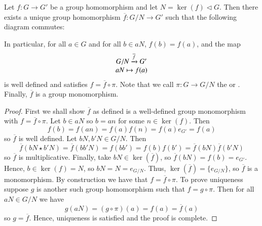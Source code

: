 \documentclass[12pt, a4paper, oneside, openright, titlepage]{book}
\begin{document}
\begin{namthm}
        Let $f:G\rightarrow G'$ be a group homomorphism and let $N = \ker(f) \vartriangleleft G$. Then there exists a unique group homomorphism $\overline{f}:G/N\rightarrow G'$ such that the following diagram commutes: 
        \begin{center}
        \end{center}
        In particular, for all $a \in G$ and for all $b \in aN$, $f(b) = f(a)$, and the map \begin{equation}
                \begin{array}{c} G/N\xrightarrow{\overline{f}} G' \\ aN\mapsto f(a) \end{array}
        \end{equation}
        is well defined and satisfies $f = \overline{f} \circ \pi$. Note that we call $\pi:G\rightarrow G/N$ the  or . Finally, $\overline{f}$ is a group monomorphism.
\end{namthm}
\begin{proof}
        First we shall show $\overline{f}$ as defined is a well-defined group monomorphism with $f = \overline{f} \circ \pi$. Let $b \in aN$ so $b = an$ for some $n \in \ker(f)$. Then $$f(b) = f(an) = f(a)f(n) = f(a)e_{G'} = f(a)$$ so $\overline{f}$ is well defined. Let $bN,b'N \in G/N$. Then $$\overline{f}(bN\star b'N) = \overline{f}(bb'N) = f(bb') = f(b)f(b') = \overline{f}(bN)\overline{f}(b'N)$$ so $\overline{f}$ is multiplicative. Finally, take $bN \in \ker(\overline{f})$, so $\overline{f}(bN) = f(b) = e_{G'}$. Hence, $b \in \ker(f) = N$, so $bN = N = e_{G/N}$. Thus, $\ker(\overline{f}) = \{e_{G/N}\}$, so $\overline{f}$ is a monomorphism. By construction we have that $f = \overline{f}\circ \pi$. To prove uniqueness suppose $g$ is another such group homomorphism such that $f = g\circ \pi$. Then for all $aN \in G/N$ we have $$g(aN) = (g\circ \pi)(a) = f(a) = \overline{f}(a)$$
        so $g = \overline{f}$. Hence, uniqueness is satisfied and the proof is complete.
\end{proof}
\end{document}
